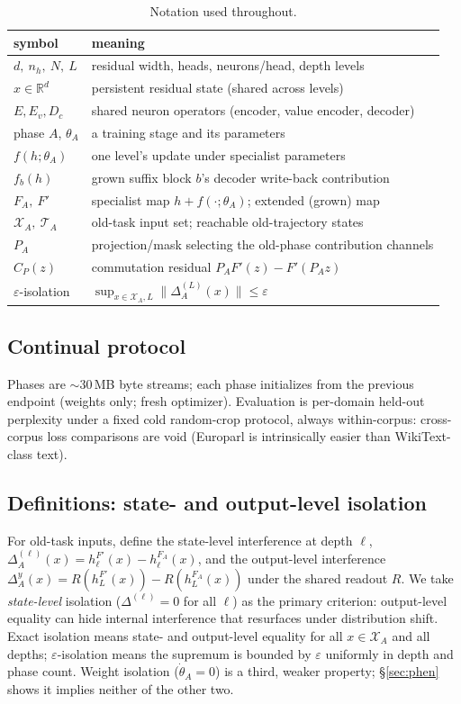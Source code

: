 \documentclass[11pt]{article}
\theoremstyle{definition}\newtheorem{definition}{Definition}
\theoremstyle{remark}\newtheorem{remark}{Remark}
\newcommand{\Xa}{\mathcal{X}_A}
\newcommand{\TA}{\mathcal{T}_A}
\begin{document}
\begin{table}[t]
\centering\small
\caption{Notation used throughout.}
\label{tab:notation}
\begin{tabular}{ll}
\toprule
symbol & meaning \\
\midrule
$d,\ n_h,\ N,\ L$ & residual width, heads, neurons/head, depth levels \\
$x\in\mathbb{R}^{d}$ & persistent residual state (shared across levels) \\
$E,E_v,D_c$ & shared neuron operators (encoder, value encoder, decoder) \\
phase $A$, $\theta_A$ & a training stage and its parameters \\
$f(h;\theta_A)$ & one level's update under specialist parameters \\
$f_b(h)$ & grown suffix block $b$'s decoder write-back contribution \\
$F_A,\ F'$ & specialist map $h{+}f(\cdot;\theta_A)$; extended (grown) map \\
$\mathcal{X}_A,\ \TA$ & old-task input set; reachable old-trajectory states \\
$P_A$ & projection/mask selecting the old-phase contribution channels \\
$C_{P}(z)$ & commutation residual $P_A F'(z)-F'(P_A z)$ \\
$\varepsilon$-isolation & $\sup_{x\in\mathcal{X}_A,L}\|\Delta^{(L)}_A(x)\|\le\varepsilon$ \\
\bottomrule
\end{tabular}
\end{table}

\subsection{Continual protocol}
Phases are ${\sim}30$\,MB byte streams; each phase initializes from the previous endpoint
(weights only; fresh optimizer). Evaluation is per-domain held-out perplexity under a fixed
cold random-crop protocol, always within-corpus: cross-corpus loss comparisons are void
(Europarl is intrinsically easier than WikiText-class text).

\subsection{Definitions: state- and output-level isolation}
For old-task inputs, define the state-level interference at depth $\ell$,
$\Delta^{(\ell)}_A(x)=h^{F'}_\ell(x)-h^{F_A}_\ell(x)$, and the output-level interference
$\Delta^{y}_A(x)=R(h^{F'}_L(x))-R(h^{F_A}_L(x))$ under the shared readout $R$. We take
\emph{state-level} isolation ($\Delta^{(\ell)}=0$ for all $\ell$) as the primary criterion:
output-level equality can hide internal interference that resurfaces under distribution
shift. Exact isolation means state- and output-level equality for all $x\in\Xa$ and all
depths; $\varepsilon$-isolation means the supremum is bounded by $\varepsilon$ uniformly in
depth and phase count. Weight isolation ($\dot\theta_A=0$) is a third, weaker property;
\S\ref{sec:phen} shows it implies neither of the other two.
\end{document}
